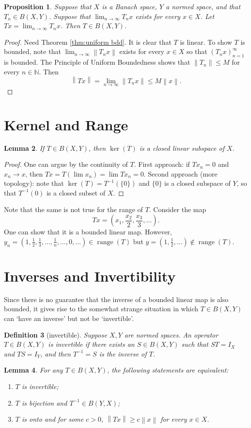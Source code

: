 \documentclass[12pt,a4paper]{report}
\numberwithin{equation}{section}
\theoremstyle{mystyle}
\newtheorem{definition}{Definition}[section]
\newtheorem{lemma}[definition]{Lemma}
\newtheorem{proposition}[definition]{Proposition}
\newcommand{\N}{\mathbb{N}}
\newcommand{\norm}[1]{\left\lVert #1 \right\rVert}
\newcommand{\range}{\operatorname{range}}
\begin{document}
	\begin{proposition}\label{prop:limit of T}
		Suppose that $X$ is a Banach space, $Y$ a normed space, and that $T_n\in B(X,Y)$. Suppose that $\lim_{n\to\infty}T_n x$ exists for every $x\in X$. Let $Tx=\lim_{n\to\infty}T_n x$. Then $T\in B(X,Y)$.
	\end{proposition}
	\begin{proof}
		Need Theorem \ref{thm:uniform bdd}. It is clear that $T$ is linear. To show $T$ is bounded, note that $\lim_{n\to\infty}\norm{T_n x}$ exists for every $x\in X$ so that $(T_n x)_{n=1}^\infty$ is bounded. The Principle of Uniform Boundedness shows that $\norm{T_n}\leq M$ for every $n\in\N$. Then 
		$$
		\norm{Tx}=\lim_{n\to\infty}\norm{T_n x}\leq M \norm{x}.
		$$
	\end{proof}

	\section{Kernel and Range}
	\begin{lemma}
		If $T\in B(X,Y)$, then $\ker(T)$ is a closed linear subspace of $X$.
	\end{lemma}
	\begin{proof}
		One can argue by the continuity of $T$. First approach: if $Tx_n=0$ and $x_n\to x$, then $Tx = T(\lim x_n)=\lim Tx_n=0$. Second approach (more topology): note that $\ker(T)=T^{-1}(\{0\})$ and $\{0\}$ is a closed subspace of $Y$, so that $T^{-1}(0)$ is a closed subset of $X$.
	\end{proof}
	
	Note that the same is not true for the range of $T$. Consider the map 
	$$
	Tx=(x_1,\frac{x_2}{2},\frac{x_3}{3},\dots).
	$$
	One can show that it is a bounded linear map. However, $y_n=(1,\frac{1}{2},\frac{1}{3},\dots,\frac{1}{n},\dots,0,\dots)\in \range(T)$ but $y=(1,\frac{1}{2},\dots)\notin \range(T)$.
	
	\section{Inverses and Invertibility}
	Since there is no guarantee that the inverse of a bounded linear map is also bounded, it gives rise to the somewhat strange situation in which $T\in B(X,Y)$ can `have an inverse' but not be `invertible'.
	\begin{definition}[invertible]
		Suppose $X,Y$ are normed spaces. An operator $T\in B(X,Y)$ is \emph{invertible} if there exists an $S\in B(X,Y)$ such that $ST=I_X$ and $TS=I_Y$, and then $T^{-1}=S$ is the inverse of $T$.
	\end{definition}
	\begin{lemma}
		For any $T\in B(X,Y)$, the following statements are equivalent:
		\begin{enumerate}
			\item $T$ is invertible;
			\item $T$ is bijection and $T^{-1}\in B(Y,X)$;
			\item $T$ is onto and for some $c>0$, $\norm{Tx}\geq c\norm{x}$ for every $x\in X$.
		\end{enumerate}
	\end{lemma}
\end{document}
